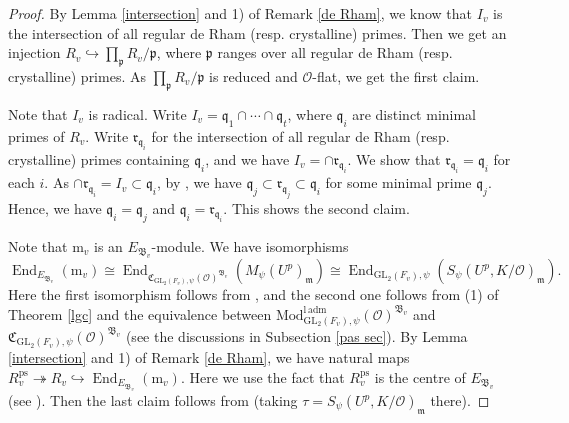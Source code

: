 \documentclass[a4paper, 12pt]{amsart}
\DeclareMathOperator{\End}{End}
\def\ps{\mathrm{ps}}
\newcommand{\GL}{\mathrm{GL}}
\newcommand{\cO}{\mathcal{O}}
\newcommand{\kq}{\mathfrak{q}}
\newcommand{\kp}{\mathfrak{p}}
\newcommand{\kC}{\mathfrak{C}}
\newcommand{\kB}{\mathfrak{B}}
\newcommand{\km}{\mathfrak{m}}
\newcommand{\mm}{\mathrm{m}}
\begin{document}
    \begin{proof}
    	By Lemma \ref{intersection} and 1) of Remark \ref{de Rham}, we know that $I_v$ is the intersection of all regular de Rham (resp. crystalline) primes. Then we get an injection $R_v \hookrightarrow \prod_\kp R_v/\kp$, where $\kp$ ranges over all regular de Rham (resp. crystalline) primes. As $ \prod_\kp R_v/\kp$ is reduced and $\cO$-flat, we get the first claim.
    	
    	Note that $I_v$ is radical. Write $I_v= \kq_1 \cap \cdots \cap \kq_t$, where $\kq_i$ are distinct  minimal primes of $R_v$. Write $ \mathfrak{r}_{\kq_i}$ for the intersection of all regular de Rham (resp. crystalline) primes containing $\kq_i $, and we have $I_v= \cap \mathfrak{r}_{\kq_i}$. We show that $ \mathfrak{r}_{\kq_i} = \kq_i$ for each $i$. As $ \cap \mathfrak{r}_{\kq_i}  =I_v \subset \kq_i$, by \cite[Lemma 10.15.1]{stacks-project}, we have $\kq_j \subset \mathfrak{r}_{\kq_j} \subset \kq_i$ for some minimal prime $\kq_j$. Hence, we have $\kq_i= \kq_j $ and $ \kq_i =  \mathfrak{r}_{\kq_i}$. This shows the second claim.
    	
    	
    	Note that $\mm_v$ is an $E_{\kB_v}$-module. We have isomorphisms
    	$$ \End_{E_{\kB_v}}(\mm_v) \cong \End_{\kC_{\GL_2(F_v),\psi}(\cO)^{\kB_v}}(M_\psi(U^p)_\km) \cong \End_{\GL_2(F_v), \psi}(S_\psi(U^p, K/\cO)_\km).$$
    	Here the first isomorphism follows from \cite[Proposition 4.19]{Pa_k_nas_2013}, and the second one follows from (1) of Theorem \ref{lgc} and the equivalence between $\mathrm{Mod}^{\mathrm{l\, adm}}_{\GL_2(F_v),\psi}(\cO)^{\kB_v} $ and $\kC_{\GL_2(F_v),\psi}(\cO)^{\kB_v} $ (see the discussions in Subsection \ref{pas sec}). By Lemma \ref{intersection} and 1) of Remark \ref{de Rham}, we have natural maps $R_v^\ps \twoheadrightarrow R_v \hookrightarrow \End_{E_{\kB_v}}(\mm_v)$. Here we use the fact that $R_v^\ps $ is the centre of $ E_{\kB_v}$ (see \cite[Theorem A.2.2]{Zhang:2024aa}). Then the last claim follows from \cite[Corollary 5.13]{Paskunas_2021} (taking $\tau = S_\psi(U^p, K/\cO)_\km$ there).
    \end{proof}
    
\end{document}
